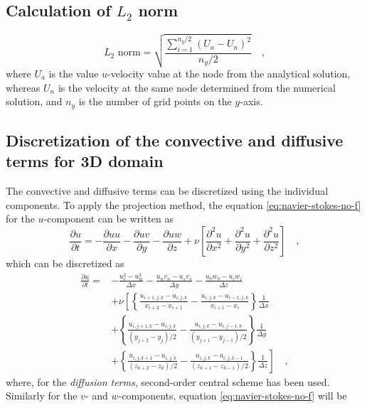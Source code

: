 \documentclass[12pt,a4paper,fleqn]{article}
\begin{document}
\subsection{Calculation of \(L_2\) norm}
\begin{equation}\label{eq:l2norm}
L_2 \text{ norm} = \sqrt{\frac{\sum\limits_{i=1}^{n_y/2}\left(U_a - U_n\right)^2}{n_y/2}} \quad,
\end{equation}
where \(U_a\) is the value \(u\)-velocity value at the node from the analytical solution, whereas \(U_n\) is the velocity at the same node determined from the numerical solution, and \(n_y\) is the number of grid points on the \(y\)-axis.

\subsection{Discretization of the convective and diffusive terms for 3D domain}
The convective and diffusive terms can be discretized using the individual components. To apply the projection method, the equation \eqref{eq:navier-stokes-no-f} for the $u$-component can be written as
\begin{equation} \label{eq:3D-convective-diffusive-u}
\frac{\partial u}{\partial t} = -\frac{\partial uu}{\partial x} -\frac{\partial uv}{\partial y} -\frac{\partial uw}{\partial z} + \nu\left[\frac{\partial^2u}{\partial x^2} + \frac{\partial^2u}{\partial y^2} + \frac{\partial^2u}{\partial z^2}\right] \quad,
\end{equation}
which can be discretized as
\begin{align}\label{eq:3D-discretized_convective-diffusive-u}
\frac{\partial u}{\partial t} =
{}& - \frac{u_e^2 - u_w^2}{\Delta x} - \frac{u_n v_n - u_s v_s}{\Delta y} - \frac{u_o w_o - u_i w_i}{\Delta z}\\
& + \nu\left[
\left\{
\frac{u_{i+1,j,k} - u_{i,j,k}}{x_{i+2}-x_{i+1}}
- \frac{u_{i,j,k} - u_{i-1,j,k}}{x_{i+1}-x_i}
\right\}
\frac{1}{\Delta x}
\right.\nonumber\\
& + \left\{
\frac{u_{i,j+1,k} - u_{i,j,k}}{(y_{j+2}-y_j)/2}
- \frac{u_{i,j,k} - u_{i,j-1,k}}{(y_{j+1}-y_{j-1})/2}
\right\}
\frac{1}{\Delta y}
\nonumber\\
& \left. + \left\{
\frac{u_{i,j,k+1} - u_{i,j,k}}{(z_{k+2}-z_k)/2}
- \frac{u_{i,j,k} - u_{i,j,k-1}}{(z_{k+1}-z_{k-1})/2}
\right\}
\frac{1}{\Delta z}
\right] \quad ,
\end{align}
where, for the \emph{diffusion terms}, second-order central scheme has been used. Similarly for the \(v\)- and \(w\)-components, equation \eqref{eq:navier-stokes-no-f} will be
\end{document}
